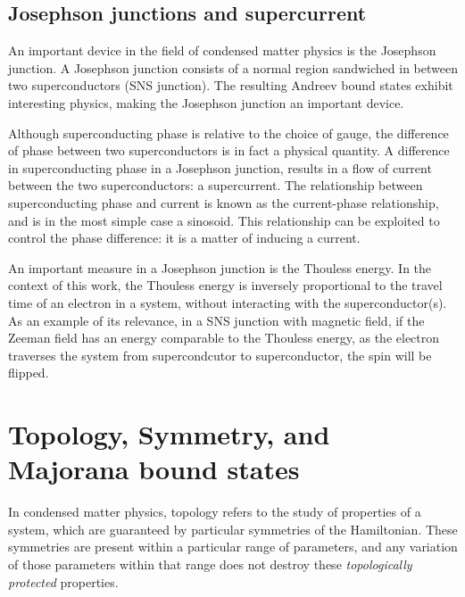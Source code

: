 	\subsection{Josephson junctions and supercurrent}
		An important device in the field of condensed matter physics is the Josephson junction.
		A Josephson junction consists of a normal region sandwiched in between two superconductors (SNS junction).
		The resulting Andreev bound states exhibit interesting physics, making the Josephson junction an important device.

		Although superconducting phase is relative to the choice of gauge, the difference of phase between two superconductors is in fact a physical quantity.
		A difference in superconducting phase in a Josephson junction, results in a flow of current between the two superconductors: a supercurrent.
		The relationship between superconducting phase and current is known as the current-phase relationship, and is in the most simple case a sinosoid.
		This relationship can be exploited to control the phase difference: it is a matter of inducing a current.

		An important measure in a Josephson junction is the Thouless energy.
		In the context of this work, the Thouless energy is inversely proportional to the travel time of an electron in a system, without interacting with the superconductor(s).
		As an example of its relevance, in a SNS junction with magnetic field, if the Zeeman field has an energy comparable to the Thouless energy, as the electron traverses the system from supercondcutor to superconductor, the spin will be flipped.

	
\section{Topology, Symmetry, and Majorana bound states}
	In condensed matter physics, topology refers to the study of properties of a system, which are guaranteed by particular symmetries of the Hamiltonian.
	These symmetries are present within a particular range of parameters, and any variation of those parameters within that range does not destroy these \emph{topologically protected} properties.
	
